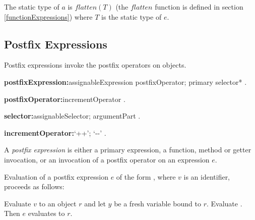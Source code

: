 \documentclass{article}
\begin{document}




\LMHash{}
The static type of $a$ is $flatten(T)$ (the $flatten$ function is defined in section \ref{functionExpressions}) where $T$ is the static type of $e$.


\subsection{Postfix Expressions}

\LMHash{}
Postfix expressions invoke the postfix operators on objects.

\begin{grammar}
{\bf postfixExpression:}assignableExpression postfixOperator;
  primary selector*
  .

{\bf postfixOperator:}incrementOperator
  .

{\bf selector:}assignableSelector;
  argumentPart
  .

{\bf incrementOperator:}`++';
  `-{}-'
  .
\end{grammar}

\LMHash{}
 A {\em postfix expression} is either a primary expression, a function, method or getter invocation, or an invocation of a postfix operator on an expression $e$.

\LMHash{}
Evaluation of a postfix expression $e$ of the form , where $v$ is an identifier, proceeds as follows:

\LMHash{}
Evaluate $v$ to an object $r$ and let $y$ be a fresh variable bound to $r$.
Evaluate .
Then $e$ evaluates to $r$.
\end{document}
